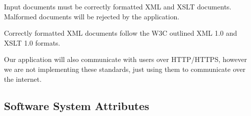 Input documents must be correctly formatted XML and XSLT documents.
Malformed documents will be rejected by the application.

Correctly formatted XML documents follow the W3C outlined XML 1.0 and XSLT 1.0 formats. \cite{xml-spec} \cite{xslt-spec}


Our application will also communicate with users over HTTP/HTTPS, however we are not implementing these standards, just using them to communicate over the internet.


\subsection{Software System Attributes}

